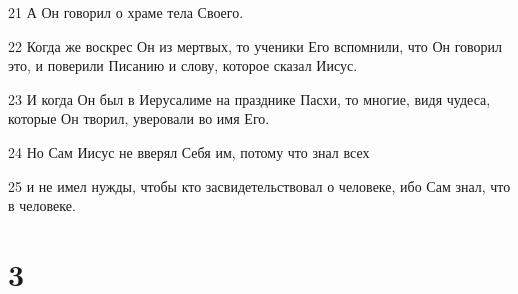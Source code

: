\par 21 А Он говорил о храме тела Своего.
\par 22 Когда же воскрес Он из мертвых, то ученики Его вспомнили, что Он говорил это, и поверили Писанию и слову, которое сказал Иисус.
\par 23 И когда Он был в Иерусалиме на празднике Пасхи, то многие, видя чудеса, которые Он творил, уверовали во имя Его.
\par 24 Но Сам Иисус не вверял Себя им, потому что знал всех
\par 25 и не имел нужды, чтобы кто засвидетельствовал о человеке, ибо Сам знал, что в человеке.

\chapter{3}

